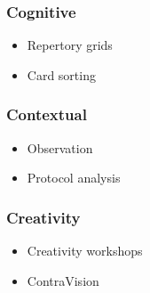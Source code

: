 \subsubsection{Cognitive}
\begin{itemize}
	\item Repertory grids
	\item Card sorting
\end{itemize}
\subsubsection{Contextual}
\begin{itemize}
	\item Observation
	\item Protocol analysis
\end{itemize}
\subsubsection{Creativity}
\begin{itemize}
	\item Creativity workshops
	\item ContraVision
\end{itemize}
 
 
 
 
 
 
 
 
 
 